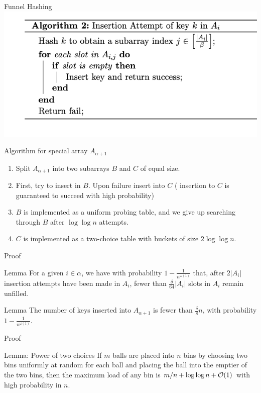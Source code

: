 \documentclass{beamer}
\begin{document}
\begin{frame}{Funnel Hashing}
	\includegraphics{insertion-attempt}
\end{frame}


\begin{frame}{Algorithm for special array $A_{\alpha + 1}$}
	\begin{enumerate}
		\item Split $A_{\alpha + 1}$ into two subarrays $B$ and $C$ of equal size. 
		\item First, try to insert in $B$. Upon failure insert into $C$ ( insertion to $C$ is guaranteed to succeed with high probability)
		\item $B$ is implemented as a uniform probing table, and we give up searching through $B$ after $\log{\log{n}}$ attempts.
		\item $C$ is implemented as a two-choice table with buckets of size $2\log{\log{n}}$. 
	\end{enumerate}
	
\end{frame}

\begin{frame}{Proof}
	\begin{block}{Lemma}
		For a given $i \in \alpha$, we have with probability $1 - \frac{1}{n^{\omega(1)}}$ that, after $2|A_i|$ insertion attempts have been made in $A_i$, fewer than $\frac{\delta}{64} |A_i|$ slots in $A_i$ remain unfilled.
	\end{block}

	\begin{block}{Lemma}
		The number of keys inserted into $A_{\alpha + 1}$ is fewer than $\frac{\delta}{8}n$, with probability $1 - \frac{1}{n^{\omega(1)}}$.
	\end{block}

\end{frame}


\begin{frame}{Proof}
	\begin{block}{Lemma: Power of two choices}
		If $m$ balls are placed into $n$ bins by choosing two bins uniformly at random for each ball and placing the ball into the emptier of the two bins, then the maximum load of any bin is $m/n + \log{\log{n}} + {\cal O}(1)$ with high probability in $n$.
	\end{block}
\end{frame}
\end{document}

